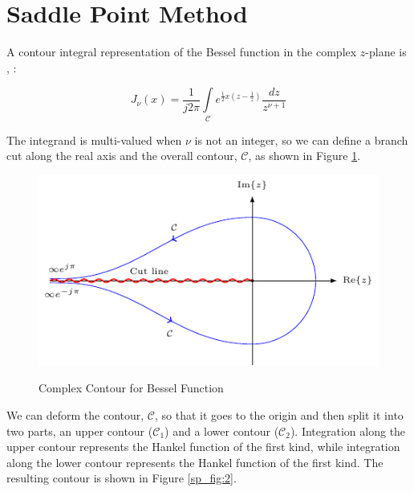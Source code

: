 \section{Saddle Point Method}\label{appendix_saddle_point_method}
A contour integral representation of the Bessel function in the complex $z$-plane is \cite{arfken_weber}, \cite{nist_handbook}:

\begin{equation}
  J_{\nu}(x) = \frac{1}{j2\pi}\int\limits_{\mathcal{C}}e^{\frac{1}{2}x\left(z- \frac{1}{z} \right)} \frac{dz}{z^{\nu+1}}
  \label{sp_eq:1}
\end{equation}
\renewcommand{\baselinestretch}{2} \small\normalsize

The integrand is multi-valued when $\nu$ is not an integer, so we can define a branch cut along the real axis and the overall contour, $\mathcal{C}$, as shown in Figure \ref{sp_fig:1}.

\begin{figure}[H]
  \begin{center}
\includegraphics[width=5in]{../media/hankel_contours-figure0.pdf}
  \end{center}
  \renewcommand{\baselinestretch}{1} \small\normalsize
  \begin{quote}
    \caption[Complex Contour for Bessel Function]{ Complex Contour for Bessel Function\label{sp_fig:1}}
  \end{quote}
\end{figure}
\renewcommand{\baselinestretch}{2} \small\normalsize

We can deform the contour, $\mathcal{C}$, so that it goes to the origin and then split it into two parts, an upper contour ($\mathcal{C}_1$) and a lower contour ($\mathcal{C}_2$). Integration along the upper contour represents the Hankel function of the first kind, while integration along the lower contour represents the Hankel function of the first kind. The resulting contour is shown in Figure \ref{sp_fig:2}.


